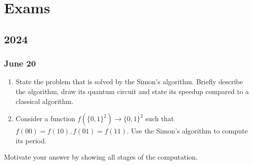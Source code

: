 \section{Exams}

\subsection{2024}

\subsubsection{June 20}

{}
\begin{enumerate}
    \item State the problem that is solved by the Simon's algorithm. Briefly describe the algorithm, draw its quantum circuit and state its speedup compared to a classical algorithm.

    \item Consider a function $f(\{0,1\}^2) \to \{0,1\}^2$ such that $f(00)=f(10), f(01)=f(11)$. Use the Simon's algorithm to compute its period.
\end{enumerate}
Motivate your answer by showing all stages of the computation.

